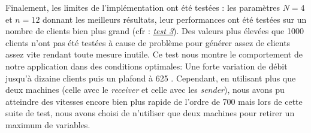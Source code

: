 \documentclass[../main.tex]{subfiles}
\begin{document}
Finalement, les limites de l'implémentation ont été testées : les paramètres $N = 4$ et $n = 12$ donnant les meilleurs résultats, leur performances ont été 
testées sur un nombre de clients bien plus grand (cfr : \hyperref[sec:plot_max]{\textit{test 3}}). Des valeurs plus élevées que 1000 clients n'ont pas été 
testées à cause de problème pour générer assez de clients assez vite rendant toute mesure inutile.
Ce test nous montre le comportement de notre application dans des conditions optimales: Une forte variation de débit jusqu'à dizaine clients puis un plafond à 625 .
Cependant, en utilisant plus que deux machines (celle avec le \textit{receiver} et celle avec les \textit{sender}), nous avons pu atteindre des vitesses
encore bien plus rapide de l'ordre de 700  mais lors de cette suite de test, nous avons choisi de n'utiliser que deux machines pour retirer
un maximum de variables.
\end{document}
